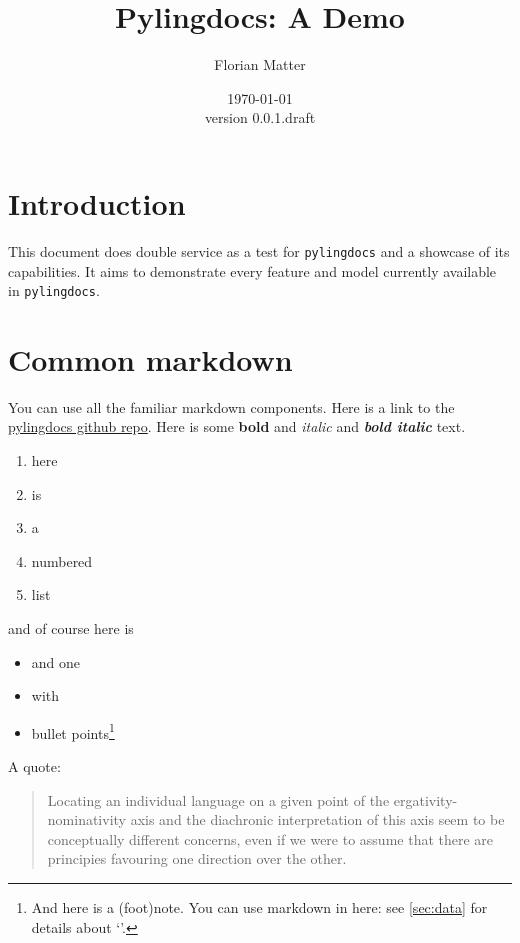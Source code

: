 \documentclass{article}
\title{Pylingdocs: A Demo}
\author{Florian Matter}
\date{\today\\version 0.0.1.draft}
\begin{document}
\maketitle

\tableofcontents


\section{\texorpdfstring{Introduction \label{sec:intro}}{Introduction }}

This document does double service as a test for \texttt{pylingdocs} and
a showcase of its capabilities. It aims to demonstrate every feature and
model currently available in \texttt{pylingdocs}.

\section{Common markdown}

You can use all the familiar markdown components. Here is a link to the
\href{https://github.com/fmatter/pylingdocs/}{pylingdocs github repo}.
Here is some \textbf{bold} and \emph{italic} and \textbf{\emph{bold
italic}} text.

\begin{enumerate}
\def\labelenumi{\arabic{enumi}.}
\tightlist
\item
  here
\item
  is
\item
  a
\item
  numbered
\item
  list
\end{enumerate}

and of course here is

\begin{itemize}
\tightlist
\item
  and one
\item
  with
\item
  bullet points\footnote{And here is a (foot)note. You can use markdown
    in here: see \cref{sec:data} for details about  `'.}
\end{itemize}

A quote:

\begin{quote}
Locating an individual language on a given point of the
ergativity-nominativity axis and the diachronic interpretation of this
axis seem to be conceptually different concerns, even if we were to
assume that there are principies favouring one direction over the other.
\parencites[71]{alvarez1998split}
\end{quote}
\end{document}
